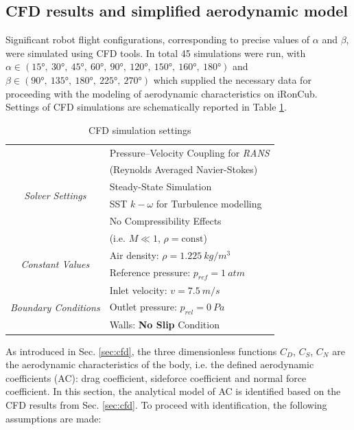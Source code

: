 \subsection{CFD results and simplified aerodynamic model}\label{sec:aeroModel}

Significant robot flight configurations, corresponding to precise values of $\alpha$ and $\beta$, were simulated using CFD tools. In total 45 simulations were run, with $ \alpha \in (\ang{15},\ \ang{30},\ \ang{45},\ \ang{60},\ \ang{90},\ \ang{120},\ \ang{150},\ \ang{160},\ \ang{180})$ and $ \beta \in (\ang{90},\ \ang{135},\ \ang{180},\ \ang{225},\ \ang{270})$ which supplied the necessary data for proceeding with the modeling of aerodynamic characteristics on iRonCub. Settings of CFD simulations are schematically reported in Table \ref{table:cfd}.

\begin{table}[t]
\caption{CFD simulation settings}
\label{table:cfd}
	\centering
	\begin{tabular}{c|l}
	    \toprule
	    \multirow{6}{*}{\textit{Solver Settings}} & Pressure--Velocity Coupling for \emph{RANS} \\ & (Reynolds Averaged Navier-Stokes) \\ & Steady-State Simulation\\ & SST $k - \omega$ for Turbulence modelling \\ & No Compressibility Effects \\ & (i.e. $M\ll1$, $\rho = \text{const}$)\\
		\midrule
		\multirow{2}{*}{\textit{Constant Values}} & Air density: $\rho = \SI{1.225}{kg/m^3}$ \\ & Reference pressure: $p_{ref} = \SI{1}{atm}$\\
        \midrule
        \multirow{3}{*}{\textit{Boundary Conditions}} & Inlet velocity: $v = \SI{7.5}{m/s}$ \\ & Outlet pressure: $p_{rel} = \SI{0}{Pa}$\\ & Walls: \textbf{No Slip} Condition\\
		\bottomrule
	\end{tabular}
\end{table}

As introduced in Sec. \ref{sec:cfd}, the three dimensionless functions $C_D$, $C_S$, $C_N$ are the aerodynamic characteristics of the body, i.e. the defined aerodynamic coefficients (AC): drag coefficient, sideforce coefficient and normal force coefficient. In this section, the analytical model of AC is identified based on the CFD results from Sec. \ref{sec:cfd}. To proceed with identification, the following assumptions are made:

